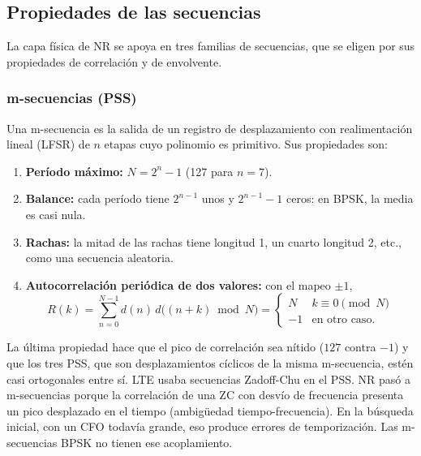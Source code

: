 \subsection{Propiedades de las secuencias}\label{sec:secuencias}
La capa física de NR se apoya en tres familias de secuencias, que se eligen por sus propiedades de correlación y de envolvente.

\subsubsection{m-secuencias (PSS)}
Una m-secuencia es la salida de un registro de desplazamiento con realimentación lineal (LFSR) de $n$ etapas cuyo polinomio es primitivo. Sus propiedades son:
\begin{enumerate}
  \item \textbf{Período máximo:} $N = 2^n - 1$ (127 para $n=7$).
  \item \textbf{Balance:} cada período tiene $2^{n-1}$ unos y $2^{n-1}-1$ ceros: en BPSK, la media es casi nula.
  \item \textbf{Rachas:} la mitad de las rachas tiene longitud 1, un cuarto longitud 2, etc., como una secuencia aleatoria.
  \item \textbf{Autocorrelación periódica de dos valores:} con el mapeo $\pm 1$,
  \begin{equation}
  R(k) = \sum_{n=0}^{N-1} d(n)\,d\big((n+k)\bmod N\big) =
  \begin{cases} N & k\equiv 0 \pmod N\\ -1 & \text{en otro caso.}\end{cases}
  \label{eq:autocorr_m}
  \end{equation}
\end{enumerate}
La última propiedad hace que el pico de correlación sea nítido ($127$ contra $-1$) y que los tres PSS, que son desplazamientos cíclicos de la misma m-secuencia, estén casi ortogonales entre sí. LTE usaba secuencias Zadoff-Chu en el PSS. NR pasó a m-secuencias porque la correlación de una ZC con desvío de frecuencia presenta un pico desplazado en el tiempo (ambigüedad tiempo-frecuencia). En la búsqueda inicial, con un CFO todavía grande, eso produce errores de temporización. Las m-secuencias BPSK no tienen ese acoplamiento.

